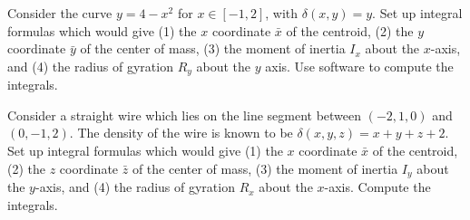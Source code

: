 \begin{problem}
Consider the curve $y=4-x^2$ for $x\in[-1,2]$, with $\delta (x,y) = y$.  Set up integral formulas which would give (1) the $x$ coordinate $\bar x$ of the centroid, (2) the $y$ coordinate $\bar y$ of the center of mass, (3) the moment of inertia $I_x$ about the $x$-axis, and (4) the radius of gyration $R_y$ about the $y$ axis. Use software to compute the integrals.
\end{problem}

\begin{problem}
 Consider a straight wire which lies on the line segment between $(-2,1,0)$ and $(0,-1,2)$. The density of the wire is known to be $\delta(x,y,z) = x+y+z+2$. Set up integral formulas which would give (1) the $x$ coordinate $\bar x$ of the centroid, (2) the $z$ coordinate $\bar z$ of the center of mass, (3) the moment of inertia $I_y$ about the $y$-axis, and (4) the radius of gyration $R_x$ about the $x$-axis. Compute the integrals.
\end{problem}


